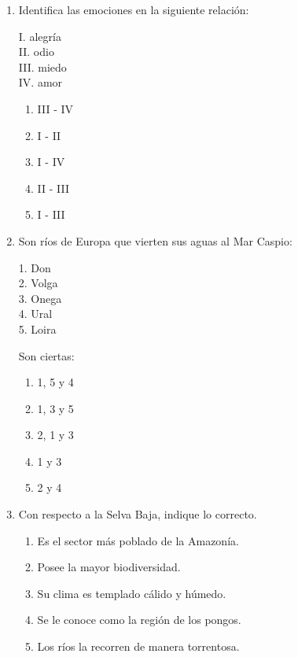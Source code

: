 \begin{enumerate}
	\item Identifica las emociones en la siguiente relación:

	I. alegría\\
	II. odio\\
	III. miedo\\
	IV. amor

	\begin{enumerate}[label=\alph*)]
		\item III - IV
		\item I - II
		\item I - IV
		\item II - III
		\item I - III
	\end{enumerate}

	\item Son ríos de Europa que vierten sus aguas al Mar Caspio:

	1. Don\\
	2. Volga\\
	3. Onega\\
	4. Ural\\
	5. Loira

	Son ciertas:
	\begin{enumerate}[label=\alph*)]
		\item 1, 5 y 4
		\item 1, 3 y 5
		\item 2, 1 y 3
		\item 1 y 3
		\item 2 y 4
	\end{enumerate}

	\item Con respecto a la Selva Baja, indique lo correcto.
	\begin{enumerate}[label=\alph*)]
		\item Es el sector más poblado de la Amazonía.
		\item Posee la mayor biodiversidad.
		\item Su clima es templado cálido y húmedo.
		\item Se le conoce como la región de los pongos.
		\item Los ríos la recorren de manera torrentosa.
	\end{enumerate}


\end{enumerate}
